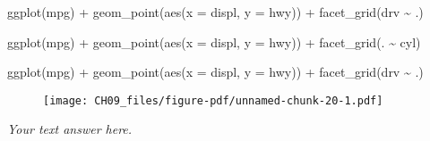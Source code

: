 \documentclass[
  letterpaper,
  DIV=11,
  numbers=noendperiod]{scrreprt}
\newenvironment{Shaded}{\begin{snugshade}}{\end{snugshade}}
\newcommand{\AttributeTok}[1]{\textcolor[rgb]{0.40,0.45,0.13}{#1}}
\newcommand{\FunctionTok}[1]{\textcolor[rgb]{0.28,0.35,0.67}{#1}}
\newcommand{\NormalTok}[1]{\textcolor[rgb]{0.00,0.23,0.31}{#1}}
\newcommand{\SpecialCharTok}[1]{\textcolor[rgb]{0.37,0.37,0.37}{#1}}
\begin{document}
\begin{enumerate}
\begin{Shaded}
\begin{Highlighting}[]
\FunctionTok{ggplot}\NormalTok{(mpg) }\SpecialCharTok{+} 
  \FunctionTok{geom\_point}\NormalTok{(}\FunctionTok{aes}\NormalTok{(}\AttributeTok{x =}\NormalTok{ displ, }\AttributeTok{y =}\NormalTok{ hwy)) }\SpecialCharTok{+}
  \FunctionTok{facet\_grid}\NormalTok{(drv }\SpecialCharTok{\textasciitilde{}}\NormalTok{ .)}
\end{Highlighting}
\end{Shaded}

\begin{Shaded}
\begin{Highlighting}[]
\FunctionTok{ggplot}\NormalTok{(mpg) }\SpecialCharTok{+} 
  \FunctionTok{geom\_point}\NormalTok{(}\FunctionTok{aes}\NormalTok{(}\AttributeTok{x =}\NormalTok{ displ, }\AttributeTok{y =}\NormalTok{ hwy)) }\SpecialCharTok{+}
  \FunctionTok{facet\_grid}\NormalTok{(. }\SpecialCharTok{\textasciitilde{}}\NormalTok{ cyl)}
\end{Highlighting}
\end{Shaded}

  \begin{tcolorbox}[enhanced jigsaw, left=2mm, rightrule=.15mm, bottomtitle=1mm, opacitybacktitle=0.6, leftrule=.75mm, opacityback=0, colframe=quarto-callout-note-color-frame, bottomrule=.15mm, coltitle=black, toptitle=1mm, colback=white, titlerule=0mm, colbacktitle=quarto-callout-note-color!10!white, title={Answer}, toprule=.15mm, breakable, arc=.35mm]

\begin{Shaded}
\begin{Highlighting}[]
\FunctionTok{ggplot}\NormalTok{(mpg) }\SpecialCharTok{+} 
  \FunctionTok{geom\_point}\NormalTok{(}\FunctionTok{aes}\NormalTok{(}\AttributeTok{x =}\NormalTok{ displ, }\AttributeTok{y =}\NormalTok{ hwy)) }\SpecialCharTok{+}
  \FunctionTok{facet\_grid}\NormalTok{(drv }\SpecialCharTok{\textasciitilde{}}\NormalTok{ .)}
\end{Highlighting}
\end{Shaded}

  \begin{figure}[H]

  {\centering \texttt{[image: CH09\_files/figure-pdf/unnamed-chunk-20-1.pdf]}

  }

  \end{figure}

  \emph{Your text answer here.}


\end{tcolorbox}
\end{enumerate}
\end{document}
